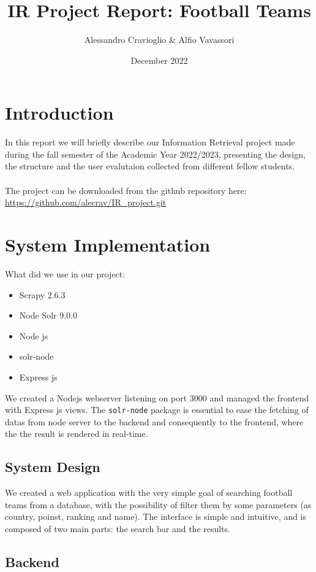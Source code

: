\documentclass{article}
\title{IR Project Report: Football Teams}
\author{Alessandro Cravioglio & Alfio Vavassori}
\date{December 2022}
\begin{document}
\maketitle
\section{Introduction}
In this report we will briefly describe our Information Retrieval project made during the fall semester of the Academic Year 2022/2023, presenting the design, the structure and the user evalutaion collected from different fellow students. \\\\
The project can be downloaded from the github repository here:\\
\url{https://github.com/alecrav/IR_project.git}


\section{System Implementation}
What did we use in our project:
\begin{itemize}
    \item Scrapy 2.6.3
    \item Node Solr 9.0.0
    \item Node js
    \item solr-node
    \item Express js
\end{itemize}
We created a Nodejs webserver listening on port 3000 and managed the frontend with Express js views. The \texttt{solr-node} package is essential to ease the fetching of datas from node server to the backend and consequently to the frontend, where the the result is rendered in real-time.
\subsection{System Design}
We created a web application with the very simple goal of searching football teams from a database, with the possibility of filter them by some parameters (as country, poinst, ranking and name).
The interface is simple and intuitive, and is composed of two main parts: the search bar and the results.

\subsection{Backend}
\end{document}
